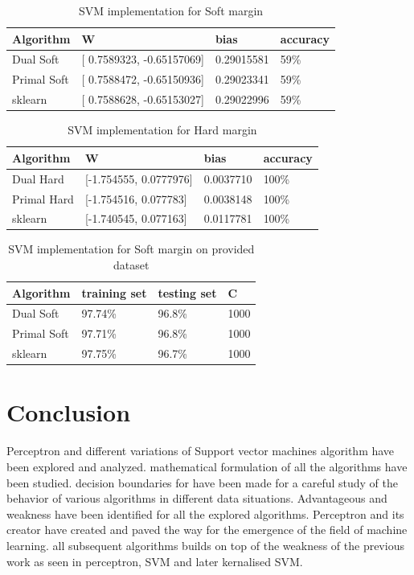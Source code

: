 \documentclass[10pt,twocolumn,letterpaper]{article}
\begin{document}
\begin{table}[htb]
\centering
\begin{tabular}{|l|l|l|l|} 
\toprule
Algorithm   & W                           & bias       & accuracy  \\ 
\hline
Dual Soft   & {[} 0.7589323, -0.65157069] & 0.29015581 & 59\%      \\ 
\hline
Primal Soft & {[} 0.7588472, -0.65150936] & 0.29023341 & 59\%      \\ 
\hline
sklearn     & {[} 0.7588628, -0.65153027] & 0.29022996 & 59\%      \\
\bottomrule
\end{tabular}
\caption{SVM implementation for Soft margin}
\label{tab:SVM_soft}
\end{table}



\begin{table}[htb]
\centering
\begin{tabular}{|l|l|l|l|} 
\toprule
Algorithm   & W                        & bias      & accuracy  \\ 
\hline
Dual Hard   & {[}-1.754555, 0.0777976] & 0.0037710 & 100\%     \\ 
\hline
Primal Hard & {[}-1.754516, 0.077783]  & 0.0038148 & 100\%     \\ 
\hline
sklearn     & {[}-1.740545, 0.077163]  & 0.0117781 & 100\%     \\
\bottomrule
\end{tabular}
\caption{SVM implementation for Hard margin}
\label{tab:SVM_hard}
\end{table}



\begin{table}
\centering
\begin{tabular}{|l|l|l|l|} 
\toprule
Algorithm   & training set & testing set & C     \\ 
\hline
Dual Soft   & 97.74\%      & 96.8\%      & 1000  \\ 
\hline
Primal Soft & 97.71\%      & 96.8\%      & 1000  \\ 
\hline
sklearn     & 97.75\%      & 96.7\%      & 1000  \\
\bottomrule
\end{tabular}
\caption{SVM implementation for Soft margin on provided dataset}
\label{tab:SVM_soft_data}
\end{table}

\section{Conclusion}
Perceptron and different variations of Support vector machines algorithm have been explored and analyzed. mathematical formulation of all the algorithms have been studied. decision boundaries for have been made for a careful study of the behavior of various algorithms in different data situations. Advantageous and weakness have been identified for all the explored algorithms. Perceptron and its creator have created and paved the way for the emergence of the field of machine learning. all subsequent algorithms builds on top of the weakness of the previous work as seen in perceptron, SVM and later kernalised SVM.
\end{document}
